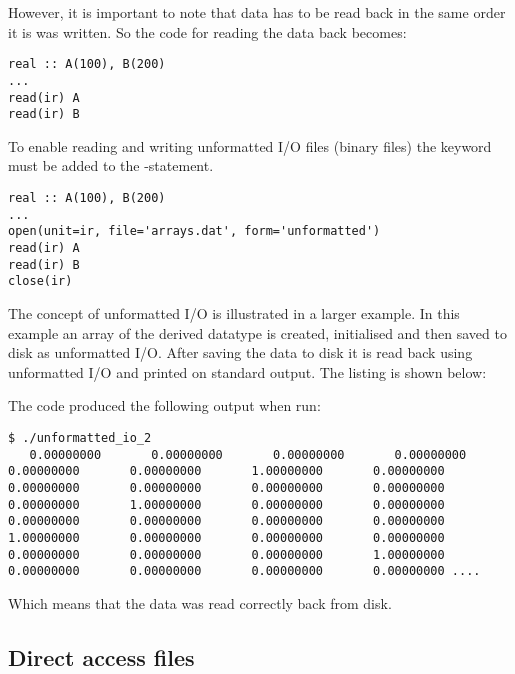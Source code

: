 However, it is important to note that data has to be read back in the same order it is was written. So the code for reading the data back becomes:

\begin{lstlisting}
real :: A(100), B(200)
...
read(ir) A
read(ir) B
\end{lstlisting}

To enable reading and writing unformatted I/O files (binary files) the keyword  must be added to the -statement. 

\begin{lstlisting}
real :: A(100), B(200)
...
open(unit=ir, file='arrays.dat', form='unformatted')
read(ir) A
read(ir) B
close(ir)
\end{lstlisting}

The concept of unformatted I/O is illustrated in a larger example. In this example an array of the derived datatype  is created, initialised and then saved to disk as unformatted I/O. After saving the data to disk it is read back using unformatted I/O and printed on standard output. The listing is shown below:



The code produced the following output when run:

\cmdmode

\begin{lstlisting}
$ ./unformatted_io_2
   0.00000000       0.00000000       0.00000000       0.00000000       0.00000000       0.00000000       1.00000000       0.00000000       0.00000000       0.00000000       0.00000000       0.00000000       0.00000000       1.00000000       0.00000000       0.00000000       0.00000000       0.00000000       0.00000000       0.00000000       1.00000000       0.00000000       0.00000000       0.00000000       0.00000000       0.00000000       0.00000000       1.00000000       0.00000000       0.00000000       0.00000000       0.00000000 ....
\end{lstlisting}%

Which means that the data was read correctly back from disk. 

\subsection{Direct access files}

